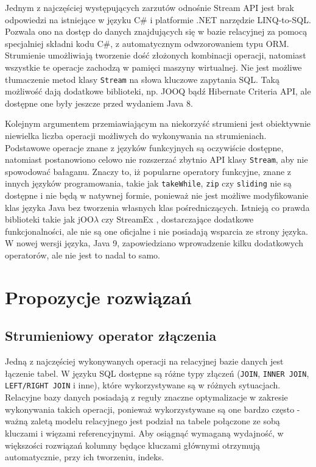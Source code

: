 \documentclass[12pt]{extarticle}
\begin{document}
    Jednym z najczęściej występujących zarzutów odnośnie Stream API jest brak odpowiedzi na istniejące w języku C\# i platformie .NET narzędzie LINQ-to-SQL. Pozwala ono na dostęp do danych znajdujących się w bazie relacyjnej za pomocą specjalniej składni kodu C\#, z automatycznym odwzorowaniem typu ORM. Strumienie umożliwiają tworzenie dość złożonych kombinacji operacji, natomiast wszystkie te operacje zachodzą w pamięci maszyny wirtualnej. Nie jest możliwe tłumaczenie metod klasy \texttt{Stream} na słowa kluczowe zapytania SQL. Taką możliwość dają dodatkowe biblioteki, np. JOOQ bądź Hibernate Criteria API, ale dostępne one były jeszcze przed wydaniem Java 8. 

    Kolejnym argumentem przemiawiającym na niekorzyść strumieni jest obiektywnie niewielka liczba operacji możliwych do wykonywania na strumieniach. Podstawowe operacje znane z języków funkcyjnych są oczywiście dostępne, natomiast postanowiono celowo nie rozszerzać zbytnio API klasy \texttt{Stream}, aby nie spowodować bałaganu. Znaczy to, iż popularne operatory funkcyjne, znane z innych języków programowania, takie jak \texttt{takeWhile}, \texttt{zip} czy \texttt{sliding} nie są dostępne i nie będą w natywnej formie, ponieważ nie jest możliwe modyfikowanie klas języka Java bez tworzenia własnych klas pośredniczących. Istnieją co prawda biblioteki takie jak jOO$\lambda$ \cite{joolambda} czy StreamEx \cite{streamex}, dostarczające dodatkowe funkcjonalności, ale nie są one oficjalne i nie posiadają wsparcia ze strony języka. W nowej wersji języka, Java 9, zapowiedziano wprowadzenie kilku dodatkowych operatorów, ale nie jest to nadal to samo.


\section{Propozycje rozwiązań}

\subsection{Strumieniowy operator złączenia} \label{proposal}

    Jedną z najczęściej wykonywanych operacji na relacyjnej bazie danych jest łączenie tabel. W języku SQL dostępne są różne typy złączeń (\texttt{JOIN}, \texttt{INNER JOIN}, \texttt{LEFT/RIGHT JOIN} i inne), które wykorzystywane są w różnych sytuacjach. Relacyjne bazy danych posiadają z reguły znaczne optymalizacje w zakresie wykonywania takich operacji, ponieważ wykorzystywane są one bardzo często - ważną zaletą modelu relacyjnego jest podział na tabele połączone ze sobą kluczami i więzami referencyjnymi. Aby osiągnąć wymaganą wydajność, w większości rozwiązań kolumny będące kluczami głównymi otrzymują automatycznie, przy ich tworzeniu, indeks.
\end{document}
